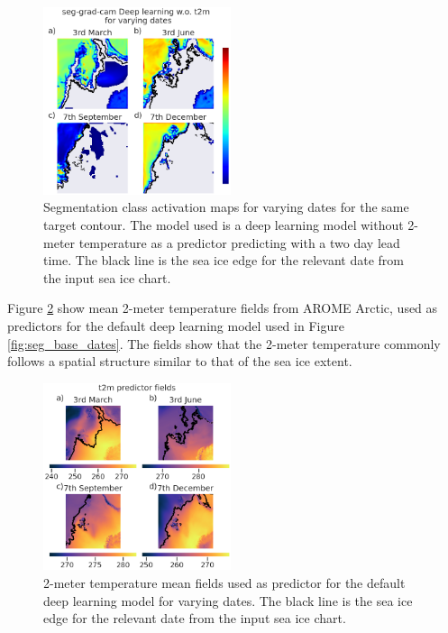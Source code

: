 \documentclass[../main/thesis.tex]{subfiles}
\begin{document}
\begin{figure}
    \centering
    \includegraphics[width=0.49\textwidth]{not2m_dates}
    \caption{\label{fig:seg_not2m_dates}Segmentation class activation maps for varying dates for the same target contour. The model used is a deep learning model without 2-meter temperature as a predictor predicting with a two day lead time. The black line is the sea ice edge for the relevant date from the input sea ice chart.}
\end{figure}

Figure \ref{fig:t2m_dates} show mean 2-meter temperature fields from AROME Arctic, used as predictors for the default deep learning model used in Figure \ref{fig:seg_base_dates}. The fields show that the 2-meter temperature commonly follows a spatial structure similar to that of the sea ice extent.

\begin{figure}
    \centering
    \includegraphics[width=0.49\textwidth]{t2m}
    \caption{\label{fig:t2m_dates}2-meter temperature mean fields used as predictor for the default deep learning model for varying dates. The black line is the sea ice edge for the relevant date from the input sea ice chart.}
\end{figure}
\end{document}
